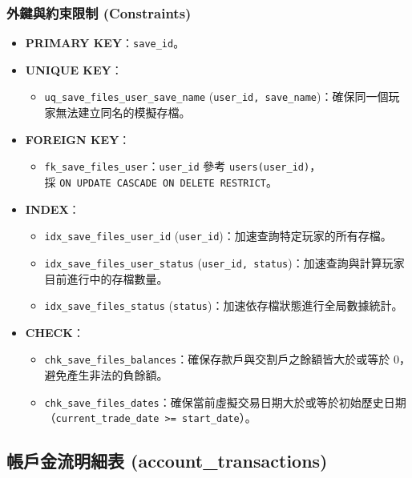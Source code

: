 \documentclass[UTF8, a4paper, 12pt, fontset=none]{ctexart}
\begin{document}
    \subsubsection*{外鍵與約束限制 (Constraints)}
    \begin{itemize}
        \item \textbf{PRIMARY KEY}：\texttt{save\_id}。
        \item \textbf{UNIQUE KEY}：
            \begin{itemize}
                \item \texttt{uq\_save\_files\_user\_save\_name} (\texttt{user\_id, save\_name})：確保同一個玩家無法建立同名的模擬存檔。
            \end{itemize}
        \item \textbf{FOREIGN KEY}：
            \begin{itemize}
                \item \texttt{fk\_save\_files\_user}：\texttt{user\_id} 參考 \texttt{users(user\_id)}，\\採 \texttt{ON UPDATE CASCADE ON DELETE RESTRICT}。
            \end{itemize}
        \item \textbf{INDEX}：
            \begin{itemize}
                \item \texttt{idx\_save\_files\_user\_id} (\texttt{user\_id})：加速查詢特定玩家的所有存檔。
                \item \texttt{idx\_save\_files\_user\_status} (\texttt{user\_id, status})：加速查詢與計算玩家目前進行中的存檔數量。
                \item \texttt{idx\_save\_files\_status} (\texttt{status})：加速依存檔狀態進行全局數據統計。
            \end{itemize}
        \item \textbf{CHECK}：
            \begin{itemize}
                \item \texttt{chk\_save\_files\_balances}：確保存款戶與交割戶之餘額皆大於或等於 0，避免產生非法的負餘額。
                \item \texttt{chk\_save\_files\_dates}：確保當前虛擬交易日期大於或等於初始歷史日期（\texttt{current\_trade\_date >= start\_date}）。
            \end{itemize}
    \end{itemize}

    \subsection{帳戶金流明細表 (account\_transactions)}
    
\end{document}
